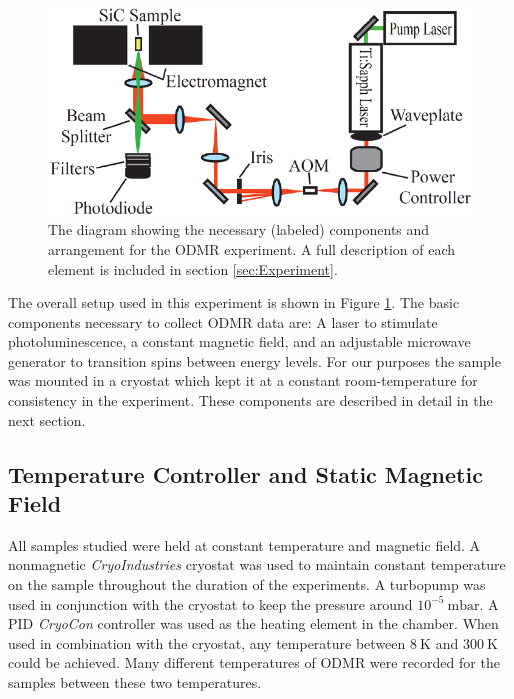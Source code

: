 \documentclass[oneside, noacknowlegments]{BYUPhys}
\begin{document}
\begin{figure}
    \centerline{\includegraphics{setup_fig}}
    \caption[Diagram of Experimental Setup for ODMR]{\label{fig:setup}
     The diagram showing the necessary (labeled) components and arrangement for the ODMR experiment. A full description of each element is included in section \ref{sec:Experiment}.}
 \end{figure}

The overall setup used in this experiment is shown in Figure \ref{fig:setup}. The basic components necessary to collect ODMR data are: A laser to stimulate photoluminescence, a constant magnetic field, and an adjustable microwave generator to transition spins between energy levels. For our purposes the sample was mounted in a cryostat which kept it at a constant room-temperature for consistency in the experiment. These components are described in detail in the next section.

\subsection{Temperature Controller and Static Magnetic Field}

All samples studied were held at constant temperature and magnetic field. A nonmagnetic \textit{CryoIndustries} cryostat was used to maintain constant temperature on the sample throughout the duration of the experiments. A turbopump was used in conjunction with the cryostat to keep the pressure around $10^{-5}~\text{mbar}$. A PID \textit{CryoCon} controller was used as the heating element in the chamber. When used in combination with the cryostat, any temperature between $8~\text{K}$ and $300~\text{K}$ could be achieved. Many different temperatures of ODMR were recorded for the samples between these two temperatures.
\end{document}
